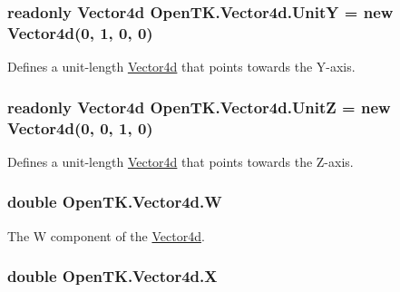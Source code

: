\hypertarget{struct_open_t_k_1_1_vector4d_ae5a0e650e3a76c7cbb541c84d25934ac}{
\subsubsection[{Unit\-Y}]{\setlength{\rightskip}{0pt plus 5cm}readonly {\bf Vector4d} Open\-T\-K.\-Vector4d.\-Unit\-Y = new {\bf Vector4d}(0, 1, 0, 0)\hspace{0.3cm}{\ttfamily [static]}}}\label{struct_open_t_k_1_1_vector4d_ae5a0e650e3a76c7cbb541c84d25934ac}


Defines a unit-\/length \hyperlink{struct_open_t_k_1_1_vector4d}{Vector4d} that points towards the Y-\/axis. 

\hypertarget{struct_open_t_k_1_1_vector4d_a362b8ee3aa8ea327234d5082c4320404}{
\subsubsection[{Unit\-Z}]{\setlength{\rightskip}{0pt plus 5cm}readonly {\bf Vector4d} Open\-T\-K.\-Vector4d.\-Unit\-Z = new {\bf Vector4d}(0, 0, 1, 0)\hspace{0.3cm}{\ttfamily [static]}}}\label{struct_open_t_k_1_1_vector4d_a362b8ee3aa8ea327234d5082c4320404}


Defines a unit-\/length \hyperlink{struct_open_t_k_1_1_vector4d}{Vector4d} that points towards the Z-\/axis. 

\hypertarget{struct_open_t_k_1_1_vector4d_af86fa9579a6d45d153d0afceee1173ea}{
\subsubsection[{W}]{\setlength{\rightskip}{0pt plus 5cm}double Open\-T\-K.\-Vector4d.\-W}}\label{struct_open_t_k_1_1_vector4d_af86fa9579a6d45d153d0afceee1173ea}


The W component of the \hyperlink{struct_open_t_k_1_1_vector4d}{Vector4d}. 

\hypertarget{struct_open_t_k_1_1_vector4d_a323a82aafae6e3970430a78a61fd913d}{
\subsubsection[{X}]{\setlength{\rightskip}{0pt plus 5cm}double Open\-T\-K.\-Vector4d.\-X}}\label{struct_open_t_k_1_1_vector4d_a323a82aafae6e3970430a78a61fd913d}



